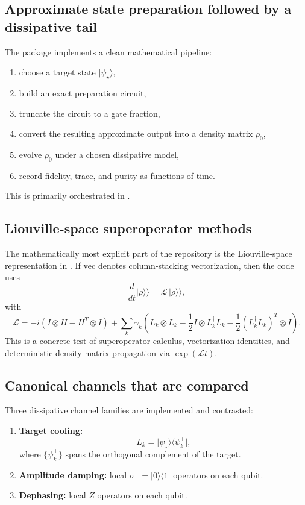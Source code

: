 \documentclass[11pt,a4paper]{article}
\begin{document}
\subsection{Approximate state preparation followed by a dissipative tail}
The package  implements a clean mathematical pipeline:
\begin{enumerate}[label=\arabic*.]
  \item choose a target state $\lvert \psi_\star\rangle$,
  \item build an exact preparation circuit,
  \item truncate the circuit to a gate fraction,
  \item convert the resulting approximate output into a density matrix $\rho_0$,
  \item evolve $\rho_0$ under a chosen dissipative model,
  \item record fidelity, trace, and purity as functions of time.
\end{enumerate}

This is primarily orchestrated in .

\subsection{Liouville-space superoperator methods}
The mathematically most explicit part of the repository is the Liouville-space representation in . If $\mathrm{vec}$ denotes column-stacking vectorization, then the code uses
\[
\frac{d}{dt}\lvert \rho \rangle\!\rangle
= \mathcal{L}\,\lvert \rho \rangle\!\rangle,
\]
with
\[
\mathcal{L}
= -i(I\otimes H - H^T\otimes I)
 + \sum_k \gamma_k
\left(
\overline{L_k}\otimes L_k
- \frac{1}{2}I\otimes L_k^\dagger L_k
- \frac{1}{2}(L_k^\dagger L_k)^T\otimes I
\right).
\]
This is a concrete test of superoperator calculus, vectorization identities, and deterministic density-matrix propagation via $\exp(\mathcal{L}t)$.

\subsection{Canonical channels that are compared}
Three dissipative channel families are implemented and contrasted:
\begin{enumerate}[label=\alph*.]
  \item \textbf{Target cooling:}
  \[
  L_k = \lvert \psi_\star\rangle \langle \psi_k^\perp \rvert,
  \]
  where $\{\psi_k^\perp\}$ spans the orthogonal complement of the target.
  \item \textbf{Amplitude damping:}
  local $\sigma^- = \lvert 0\rangle\langle 1\rvert$ operators on each qubit.
  \item \textbf{Dephasing:}
  local $Z$ operators on each qubit.
\end{enumerate}
\end{document}

